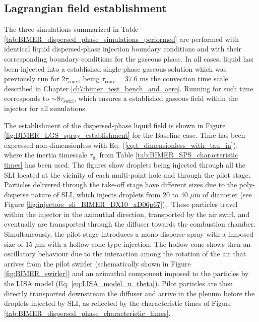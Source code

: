 \subsection{Lagrangian field establishment}

The three simulations summarized in Table \ref{tab:BIMER_dispersed_phase_simulations_performed} are performed with identical liquid dispersed-phase injection boundary conditions and with their corresponding boundary conditions for the gaseous phase. In all cases, liquid has been injected into a established single-phase gaseous solution which was previously run for $2 \tau_\mathrm{conv}$, being $\tau_\mathrm{conv} = 37.6$ ms the convection time scale described in Chapter \ref{ch7:bimer_test_bench_and_aero}. Running for such time corresponds to $\sim 8 \tau_\mathrm{swirl}$, which ensures a established gaseous field within the injector for all simulations.

The establishment of the dispersed-phase liquid field is shown in Figure \ref{fig:BIMER_LGS_spray_establishment} for the Baseline case. Time has been expressed non-dimensionless with Eq. (\ref{eq:t_dimensionless_with_tau_in}), where the inertia timescale $\tau_\mathrm{in}$ from Table \ref{tab:BIMER_SPS_characteristic times} has been used. The figures show droplets being injected through all the SLI located at the vicinity of each multi-point hole and through the pilot stage. Particles delivered through the take-off stage have different sizes due to the poly-disperse nature of SLI, which injects droplets from 20 to 40 $\mu$m of diameter (see Figure \ref{fig:injectors_sli_BIMER_DX10_xD06p67}),. These particles travel within the injector in the azimuthal direction, transported by the air swirl, and eventually are transported through the diffuser towards the combustion chamber. Simultaneously, the pilot stage introduces a mono-disperse spray with a imposed size of 15 $\mu$m with a hollow-cone type injection. The hollow cone shows then an oscillatory behaviour due to the interaction among the rotation of the air that arrives from the pilot swirler (schematically shown in Figure \ref{fig:BIMER_swirler}) and an azimuthal component imposed to the particles by the LISA model (Eq. \ref{eq:LISA_model_u_theta}). Pilot particles are then directly transported downstream the diffuser and arrive in the plenum before the droplets injected by SLI, as reflected by the characteristic times of Figure \ref{tab:BIMER_dispersed_phase_characteristic_times}.

